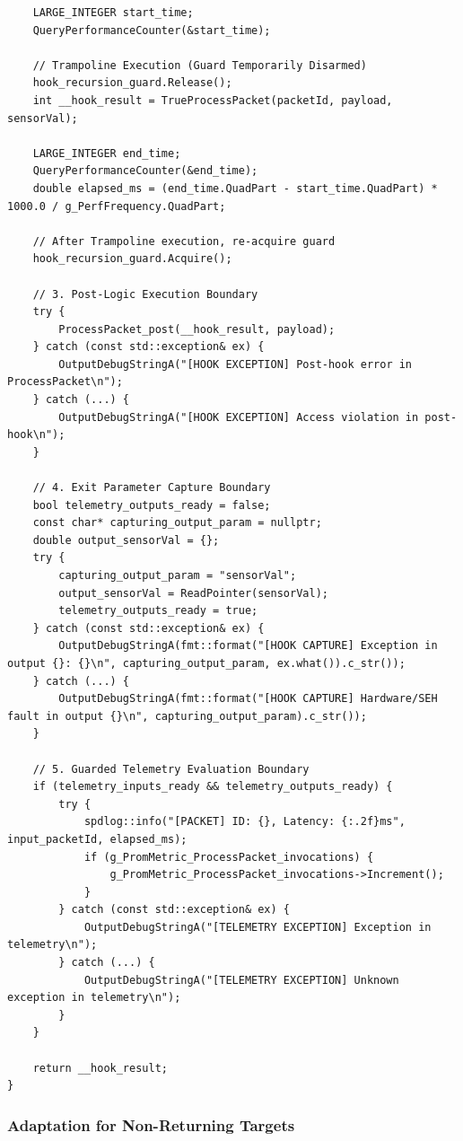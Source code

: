 \begin{lstlisting}
    LARGE_INTEGER start_time;
    QueryPerformanceCounter(&start_time);

    // Trampoline Execution (Guard Temporarily Disarmed)
    hook_recursion_guard.Release();
    int __hook_result = TrueProcessPacket(packetId, payload, sensorVal);

    LARGE_INTEGER end_time;
    QueryPerformanceCounter(&end_time);
    double elapsed_ms = (end_time.QuadPart - start_time.QuadPart) * 1000.0 / g_PerfFrequency.QuadPart;

    // After Trampoline execution, re-acquire guard
    hook_recursion_guard.Acquire();

    // 3. Post-Logic Execution Boundary
    try {
        ProcessPacket_post(__hook_result, payload);
    } catch (const std::exception& ex) {
        OutputDebugStringA("[HOOK EXCEPTION] Post-hook error in ProcessPacket\n");
    } catch (...) {
        OutputDebugStringA("[HOOK EXCEPTION] Access violation in post-hook\n");
    }

    // 4. Exit Parameter Capture Boundary
    bool telemetry_outputs_ready = false;
    const char* capturing_output_param = nullptr;
    double output_sensorVal = {};
    try {
        capturing_output_param = "sensorVal";
        output_sensorVal = ReadPointer(sensorVal);
        telemetry_outputs_ready = true;
    } catch (const std::exception& ex) {
        OutputDebugStringA(fmt::format("[HOOK CAPTURE] Exception in output {}: {}\n", capturing_output_param, ex.what()).c_str());
    } catch (...) {
        OutputDebugStringA(fmt::format("[HOOK CAPTURE] Hardware/SEH fault in output {}\n", capturing_output_param).c_str());
    }

    // 5. Guarded Telemetry Evaluation Boundary
    if (telemetry_inputs_ready && telemetry_outputs_ready) {
        try {
            spdlog::info("[PACKET] ID: {}, Latency: {:.2f}ms", input_packetId, elapsed_ms);
            if (g_PromMetric_ProcessPacket_invocations) {
                g_PromMetric_ProcessPacket_invocations->Increment();
            }
        } catch (const std::exception& ex) {
            OutputDebugStringA("[TELEMETRY EXCEPTION] Exception in telemetry\n");
        } catch (...) {
            OutputDebugStringA("[TELEMETRY EXCEPTION] Unknown exception in telemetry\n");
        }
    }

    return __hook_result;
}
\end{lstlisting}

\subsubsection{Adaptation for Non-Returning Targets}
\label{subsec:noreturn_adaptation}

